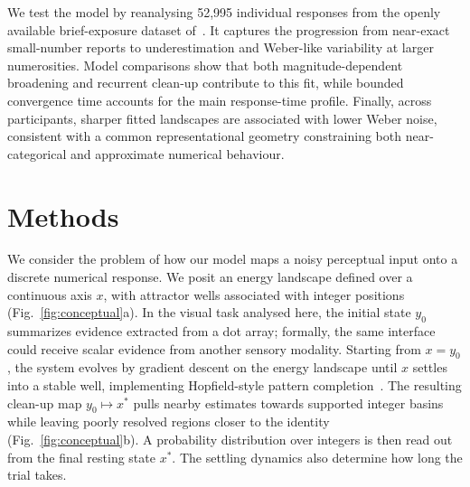 \documentclass[Afour,sageh,times]{sagej}
\begin{document}
We test the model by reanalysing 52,995 individual responses from the openly available brief-exposure dataset of~\citet{cheyette_unified_2020}. It captures the progression from near-exact small-number reports to underestimation and Weber-like variability at larger numerosities. Model comparisons show that both magnitude-dependent broadening and recurrent clean-up contribute to this fit, while bounded convergence time accounts for the main response-time profile. Finally, across participants, sharper fitted landscapes are associated with lower Weber noise, consistent with a common representational geometry constraining both near-categorical and approximate numerical behaviour.

\section{Methods}

We consider the problem of how our model maps a noisy perceptual input onto a discrete numerical response. We posit an energy landscape defined over a continuous axis $x$, with attractor wells associated with integer positions (Fig.~\ref{fig:conceptual}a). In the visual task analysed here, the initial state $y_0$ summarizes evidence extracted from a dot array; formally, the same interface could receive scalar evidence from another sensory modality. Starting from $x = y_0$, the system evolves by gradient descent on the energy landscape until $x$ settles into a stable well, implementing Hopfield-style pattern completion~\citep{hopfield_neural_1982}. The resulting clean-up map $y_0\mapsto x^*$ pulls nearby estimates towards supported integer basins while leaving poorly resolved regions closer to the identity (Fig.~\ref{fig:conceptual}b). A probability distribution over integers is then read out from the final resting state $x^*$. The settling dynamics also determine how long the trial takes.
\end{document}
